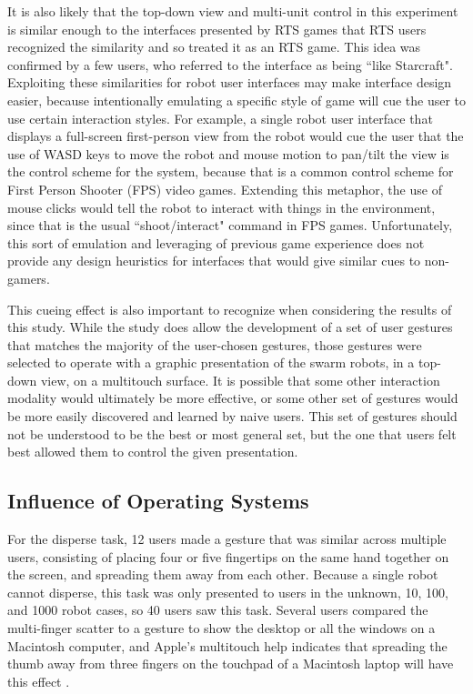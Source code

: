 It is also likely that the top-down view and multi-unit control in this experiment is similar enough to the interfaces presented by RTS games that RTS users recognized the similarity and so treated it as an RTS game.
This idea was confirmed by a few users, who referred to the interface as being ``like Starcraft". 
Exploiting these similarities for robot user interfaces may make interface design easier, because intentionally emulating a specific style of game will cue the user to use certain interaction styles. 
For example, a single robot user interface that displays a full-screen first-person view from the robot would cue the user that the use of WASD keys to move the robot and mouse motion to pan/tilt the view is the control scheme for the system, because that is a common control scheme for First Person Shooter (FPS) video games. 
Extending this metaphor, the use of mouse clicks would tell the robot to interact with things in the environment, since that is the usual ``shoot/interact" command in FPS games. 
Unfortunately, this sort of emulation and leveraging of previous game experience does not provide any design heuristics for interfaces that would give similar cues to non-gamers. 

This cueing effect is also important to recognize when considering the results of this study. 
While the study does allow the development of a set of user gestures that matches the majority of the user-chosen gestures, those gestures were selected to operate with a graphic presentation of the swarm robots, in a top-down view, on a multitouch surface. 
It is possible that some other interaction modality would ultimately be more effective, or some other set of gestures would be more easily discovered and learned by naive users. 
This set of gestures should not be understood to be the best or most general set, but the one that users felt best allowed them to control the given presentation. 

\subsection{Influence of Operating Systems}

For the disperse task, 12 users made a gesture that was similar across multiple users, consisting of placing four or five fingertips on the same hand together on the screen, and spreading them away from each other. 
Because a single robot cannot disperse, this task was only presented to users in the unknown, 10, 100, and 1000 robot cases, so 40 users saw this task. 
Several users compared the multi-finger scatter to a gesture to show the desktop or all the windows on a Macintosh computer, and Apple's multitouch help indicates that spreading the thumb away from three fingers on the touchpad of a Macintosh laptop will have this effect \citep{AppleTouchpadHelp}. 

